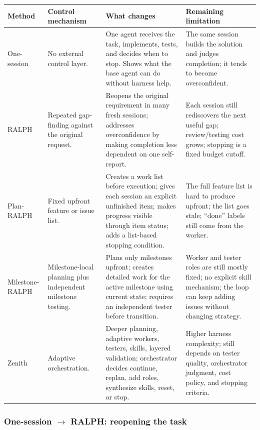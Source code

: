 \documentclass[11pt,a4paper]{article}
\renewcommand{\arraystretch}{1.18}
\newcommand{\code}[1]{#1}
\begin{document}
\begingroup
\renewcommand{\arraystretch}{1.25}
\setlength{\tabcolsep}{6pt}
\footnotesize
\noindent\begin{tabular}{@{}p{2.0cm}p{2.8cm}p{5.0cm}p{4.5cm}@{}}
\toprule
\rowcolor{tablehead}\textbf{\color{white}Method} & \textbf{\color{white}Control mechanism} & \textbf{\color{white}What changes} & \textbf{\color{white}Remaining limitation} \\
\midrule
\code{One-session}    & No external control layer. & One agent receives the task, implements, tests, and decides when to stop. Shows what the base agent can do without harness help. & The same session builds the solution and judges completion; it tends to become overconfident. \\
\rowcolor{tableband}
\code{RALPH}          & Repeated gap-finding against the original request. & Reopens the original requirement in many fresh sessions; addresses overconfidence by making completion less dependent on one self-report. & Each session still rediscovers the next useful gap; review/testing cost grows; stopping is a fixed budget cutoff. \\
\code{Plan-RALPH}     & Fixed upfront feature or issue list. & Creates a work list before execution; gives each session an explicit unfinished item; makes progress visible through item status; adds a list-based stopping condition. & The full feature list is hard to produce upfront; the list goes stale; ``done'' labels still come from the worker. \\
\rowcolor{tableband}
\code{Milestone-RALPH}& Milestone-local planning plus independent milestone testing. & Plans only milestones upfront; creates detailed work for the active milestone using current state; requires an independent tester before transition. & Worker and tester roles are still mostly fixed; no explicit skill mechanism; the loop can keep adding issues without changing strategy. \\
\code{Zenith}         & Adaptive orchestration. & Deeper planning, adaptive workers, testers, skills, layered validation; orchestrator decides continue, replan, add roles, synthesize skills, reset, or stop. & Higher harness complexity; still depends on tester quality, orchestrator judgment, cost policy, and stopping criteria. \\
\bottomrule
\end{tabular}
\endgroup

\subsubsection{One-session $\rightarrow$ RALPH: reopening the task}
\end{document}
